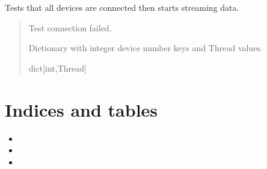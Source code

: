 \documentclass[letterpaper,10pt,english]{sphinxmanual}
\begin{document}
\begin{fulllineitems}
\begin{fulllineitems}
\end{fulllineitems}


\begin{fulllineitems}
\label{\detokenize{Setup_PodInterface:Setup_PodInterface.Setup_Interface.Stream}}
\pysigstartsignatures
{}
\pysigstopsignatures
\sphinxAtStartPar
Tests that all devices are connected then starts streaming data.
\begin{quote}\begin{description}
\sphinxAtStartPar
{} \textendash{} Test connection failed.

\sphinxAtStartPar
Dictionary with integer device number keys and Thread values.

\sphinxAtStartPar
dict{[}int,Thread{]}

\end{description}\end{quote}

\end{fulllineitems}


\end{fulllineitems}



\chapter{Indices and tables}
\label{\detokenize{index:indices-and-tables}}\begin{itemize}
\item {} 
\sphinxAtStartPar
{}

\item {} 
\sphinxAtStartPar
{}

\item {} 
\sphinxAtStartPar
{}

\end{itemize}
\end{document}
